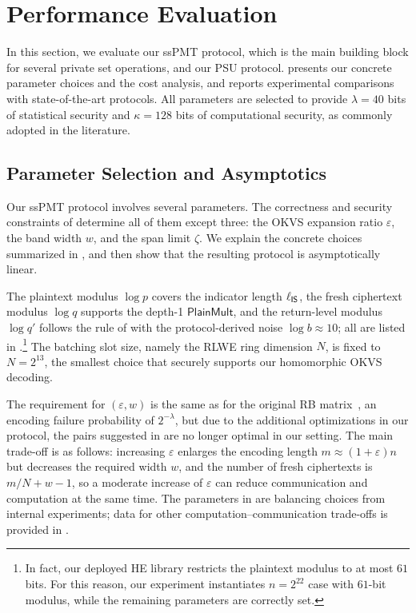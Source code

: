 
\section{Performance Evaluation}\label{sec:performance}
In this section, we evaluate our ssPMT protocol, which is the main building block for several private set operations, and our PSU protocol.  presents our concrete parameter choices and the cost analysis, and  reports experimental comparisons with state-of-the-art protocols. All parameters are selected to provide $\lambda=40$ bits of statistical security and $\kappa=128$ bits of computational security, as commonly adopted in the literature. 

\subsection{Parameter Selection and Asymptotics} \label{subsec:RSB parameter choice}
Our ssPMT protocol involves several parameters. The correctness and security constraints of  determine all of them except three: the OKVS expansion ratio $\varepsilon$, the band width $w$, and the span limit $\zeta$. We explain the concrete choices summarized in , and then show that the resulting protocol is asymptotically linear. 

The plaintext modulus $\log p$ covers the indicator length $\ell_{\sf IS}$, the fresh ciphertext modulus $\log q$ supports the depth-1 $\mathsf{PlainMult}$, and the return-level modulus $\log q'$ follows the rule of  with the protocol-derived noise $\log b \approx 10$; all are listed in .\footnote{In fact, our deployed HE library restricts the plaintext modulus to at most $61$ bits. For this reason, our experiment instantiates $n = 2^{22}$ case with $61$-bit modulus, while the remaining parameters are correctly set.}
The batching slot size, namely the RLWE ring dimension \(N\), is fixed to \(N=2^{13}\), the smallest choice that securely supports our homomorphic OKVS decoding. 

The requirement for \((\varepsilon,w)\) is the same as for the original RB matrix~\cite{BPSY23}, an encoding failure probability of \(2^{-\lambda}\), but due to the additional optimizations in our protocol, the pairs suggested in \cite{BPSY23} are no longer optimal in our setting. The main trade-off is as follows: increasing \(\varepsilon\) enlarges the encoding length \(m\approx(1+\varepsilon)n\) but decreases the required width \(w\), and the number of fresh ciphertexts is \(m/N+w-1\), so a moderate increase of \(\varepsilon\) can reduce communication and computation at the same time. The parameters in  are balancing choices from internal experiments; data for other computation--communication trade-offs is provided in .

